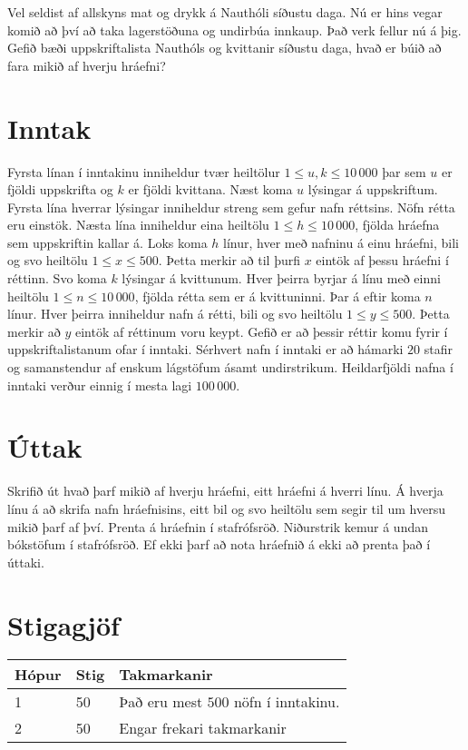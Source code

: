 
Vel seldist af allskyns mat og drykk á Nauthóli síðustu daga. Nú er hins vegar
komið að því að taka lagerstöðuna og undirbúa innkaup. Það verk fellur nú á þig.
Gefið bæði uppskriftalista Nauthóls og kvittanir síðustu daga, hvað er búið að fara
mikið af hverju hráefni?

\section*{Inntak}
Fyrsta línan í inntakinu inniheldur tvær heiltölur $1 \leq u, k \leq 10\,000$ þar sem
$u$ er fjöldi uppskrifta og $k$ er fjöldi kvittana. Næst koma $u$ lýsingar á uppskriftum.
Fyrsta lína hverrar lýsingar inniheldur streng sem gefur nafn réttsins. Nöfn rétta eru einstök.
Næsta lína inniheldur eina heiltölu $1 \leq h \leq 10\,000$, fjölda hráefna sem uppskriftin
kallar á. Loks koma $h$ línur, hver með nafninu á einu hráefni, bili og svo heiltölu $1 \leq x \leq 500$.
Þetta merkir að til þurfi $x$ eintök af þessu hráefni í réttinn.
Svo koma $k$ lýsingar á kvittunum. Hver þeirra byrjar á línu með einni heiltölu $1 \leq n \leq 10\,000$,
fjölda rétta sem er á kvittuninni. Þar á eftir koma $n$ línur. Hver þeirra inniheldur nafn á rétti,
bili og svo heiltölu $1 \leq y \leq 500$. Þetta merkir að $y$ eintök af réttinum voru keypt. Gefið
er að þessir réttir komu fyrir í uppskriftalistanum ofar í inntaki. Sérhvert nafn í inntaki er að hámarki
$20$ stafir og samanstendur af enskum lágstöfum ásamt undirstrikum. Heildarfjöldi nafna í inntaki verður
einnig í mesta lagi $100\,000$.

\section*{Úttak}
Skrifið út hvað þarf mikið af hverju hráefni, eitt hráefni á hverri línu. Á hverja línu á að skrifa
nafn hráefnisins, eitt bil og svo heiltölu sem segir til um hversu mikið þarf af því. Prenta á
hráefnin í stafrófsröð. Niðurstrik kemur á undan bókstöfum í stafrófsröð. 
Ef ekki þarf að nota hráefnið á ekki að prenta það í úttaki.

\section*{Stigagjöf}
\begin{tabular}{|l|l|l|}
\hline
Hópur & Stig & Takmarkanir \\ \hline
1     & 50   & Það eru mest $500$ nöfn í inntakinu. \\ \hline
2     & 50   & Engar frekari takmarkanir\\ \hline
\end{tabular}

